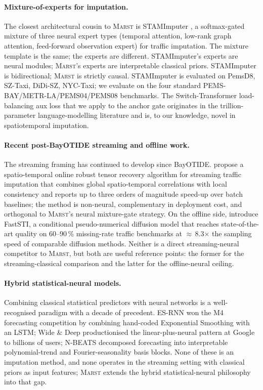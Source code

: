 \documentclass[11pt]{article}
\newcommand{\MARST}{\textsc{Marst}\xspace}
\begin{document}
\paragraph{Mixture-of-experts for imputation.}
The closest architectural cousin to \MARST is STAMImputer
\citep{wang2025stamimputer}, a softmax-gated mixture of three neural
expert types (temporal attention, low-rank graph attention,
feed-forward observation expert) for traffic imputation.  The mixture
template is the same; the experts are different.  STAMImputer's experts
are neural modules; \MARST's experts are interpretable classical
priors.  STAMImputer is bidirectional; \MARST is strictly causal.
STAMImputer is evaluated on PemsD8, SZ-Taxi, DiDi-SZ, NYC-Taxi; we
evaluate on the four standard PEMS-BAY/METR-LA/PEMS04/PEMS08
benchmarks.  The Switch-Transformer load-balancing aux loss
\citep{fedus2021switch} that we apply to the anchor gate originates in
the trillion-parameter language-modelling literature and is, to our
knowledge, novel in spatiotemporal imputation.

\paragraph{Recent post-BayOTIDE streaming and offline work.}
The streaming framing has continued to develop since BayOTIDE.
\citet{yang2025streamingtensor} propose a spatio-temporal online
robust tensor recovery algorithm for streaming traffic imputation
that combines global spatio-temporal correlations with local
consistency and reports up to three orders of magnitude speed-up over
batch baselines; the method is non-neural, complementary in
deployment cost, and orthogonal to \MARST{}'s neural mixture-gate
strategy.  On the offline side, \citet{cheng2024faststi} introduce
FastSTI, a conditional pseudo-numerical diffusion model that reaches
state-of-the-art quality on 60--90\,\% missing-rate traffic
benchmarks at $\approx$\,8.3$\times$ the sampling speed of
comparable diffusion methods.  Neither is a direct streaming-neural
competitor to \MARST, but both are useful reference points: the
former for the streaming-classical comparison and the latter for the
offline-neural ceiling.

\paragraph{Hybrid statistical-neural models.}
Combining classical statistical predictors with neural networks is a
well-recognised paradigm with a decade of precedent.  ES-RNN
\citep{smyl2020hybrid} won the M4 forecasting competition by combining
hand-coded Exponential Smoothing with an LSTM; Wide \& Deep
\citep{cheng2016wide} productionised the linear-plus-neural pattern at
Google to billions of users; N-BEATS \citep{oreshkin2020nbeats}
decomposed forecasting into interpretable polynomial-trend and
Fourier-seasonality basis blocks.  None of these is an imputation
method, and none operates in the streaming setting with classical
priors as input features; \MARST extends the hybrid statistical-neural
philosophy into that gap.
\end{document}
